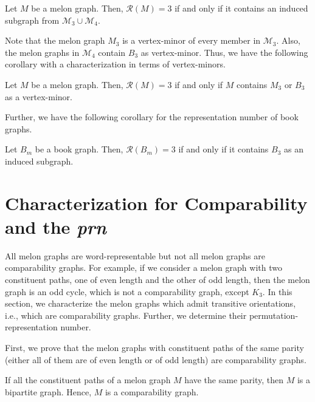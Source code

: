 \documentclass{llncs}
\begin{document}
\begin{theorem}\label{3-induced-fg}
	Let $M$ be a melon graph. Then, $\mathcal{R}(M)= 3$ if and only if it contains an induced subgraph from $\mathcal{M}_3 \cup \mathcal{M}_4$.
\end{theorem}

Note that the melon graph $M_3$ is a vertex-minor of every member in $\mathcal{M}_3$. Also, the melon graphs in $\mathcal{M}_4$ contain $B_3$ as vertex-minor. Thus, we have the following corollary with a characterization in terms of vertex-minors. 

\begin{corollary}
	Let $M$ be a melon graph. Then, $\mathcal{R}(M)= 3$ if and only if $M$ contains $M_3$ or $B_3$ as a vertex-minor.
\end{corollary}

Further, we have the following corollary for the representation number of book graphs. 

\begin{corollary}
	Let $B_m$ be a book graph. Then, $\mathcal{R}(B_m)= 3$ if and only if it contains $B_3$ as an induced subgraph.
\end{corollary}

\section{Characterization for Comparability and the \textit{prn}}
\label{char_prn}

All melon graphs are word-representable but not all melon graphs are comparability graphs. For example, if we consider a melon graph with two constituent paths, one of even length and the other of odd length, then the melon graph is an odd cycle, which is not a comparability graph, except $K_3$. In this section, we characterize the melon graphs which admit transitive orientations, i.e., which are comparability graphs. Further, we determine their permutation-representation number.

First, we prove that the melon graphs  with constituent paths of the same parity (either all of them are of even length or of odd length) are comparability graphs.

\begin{lemma}
	If all the constituent paths of a melon graph $M$ have the same parity, then $M$ is a bipartite graph. Hence, $M$ is a comparability graph.
\end{lemma}
\end{document}
